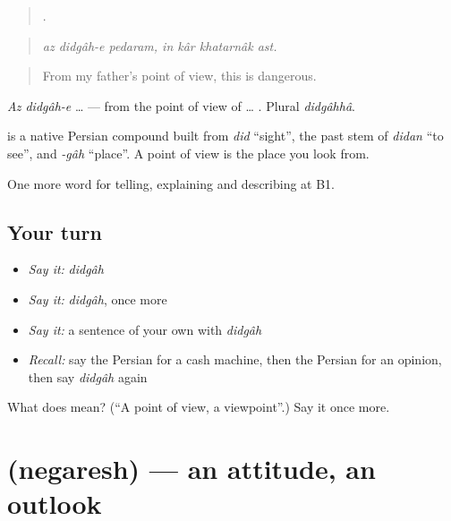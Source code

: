 \begin{quote}
      .
\end{quote}

\begin{quote}
\emph{az didgâh-e pedaram, in kâr khatarnâk ast.}
\end{quote}

\begin{quote}
From my father's point of view, this is dangerous.
\end{quote}

\emph{Az didgâh-e} … — from the point of view of … . Plural \emph{didgâhhâ}.

\begin{cousinweb}
\textbf{} is a native Persian compound built from \emph{did} \textquotedblleft{}sight\textquotedblright{}, the past stem of \emph{didan} \textquotedblleft{}to see\textquotedblright{}, and \emph{-gâh} \textquotedblleft{}place\textquotedblright{}. A point of view is the place you look from.
\end{cousinweb}

\begin{grammarlens}[title={What you've built}]
One more word for telling, explaining and describing at B1.
\end{grammarlens}

\subsection*{Your turn}
\begin{itemize}
\raggedright
  \item \emph{Say it:} \emph{didgâh}
  \item \emph{Say it:} \emph{didgâh}, once more
  \item \emph{Say it:} a sentence of your own with \emph{didgâh}
  \item \emph{Recall:} say the Persian for a cash machine, then the Persian for an opinion, then say \emph{didgâh} again
\end{itemize}

\begin{tcolorbox}[breakable,colback=teal!4,colframe=teal!35!black,title={Before you move on}]
What does  mean? (\textquotedblleft{}A point of view, a viewpoint\textquotedblright{}.) Say it once more.
\end{tcolorbox}
\section[\texorpdfstring{\fa{نگرش} (negaresh)}{نگرش (negaresh)}]{ (negaresh) — an attitude, an outlook}

